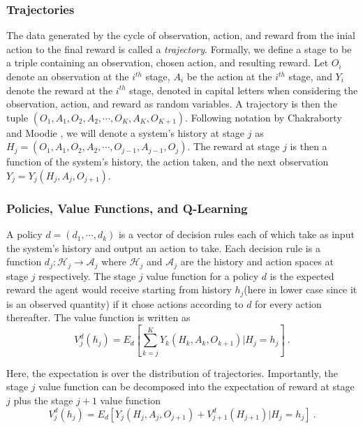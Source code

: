 \subsubsection{Trajectories}

The data generated by the cycle of observation, action, and reward from the inial action to the final reward is called a \textit{trajectory}. Formally, we define a stage to be a triple containing an observation, chosen action, and resulting reward. Let $O_i$ denote an observation at the $i^{th}$ stage, $ A_i $ be the action at the $ i^{th} $ stage, and $ Y_i $ denote the reward at the $ i^{th}$ stage, denoted in capital letters when considering the observation, action, and reward as random variables.  A  trajectory is then the tuple $ (O_1, A_1, O_2, A_2,  \cdots, O_K, A_K, O_{K+1})$.  Following notation by Chakraborty and Moodie \cite{chakraborty2013statistical}, we will denote a system’s history at stage $ j $ as $ H_j = (O_1, A_1, O_2, A_2, \cdots , O_{j-1}, A_{j-1}, O_j) $.  The reward at stage $j$ is then a function of the system’s history, the action taken, and the next observation $ Y_j = Y_j(H_j, A_j, O_{j+1}) $.

\subsubsection{Policies, Value Functions, and Q-Learning}

A policy $ d = (d_1, \cdots, d_k) $ is a vector of decision rules each of which take as input the system’s history and output an action to take.  Each decision rule is a function $d_j : \mathcal{H}_j \to \mathcal{A}_j$ where $\mathcal{H}_j$ and $\mathcal{A}_j$ are the history and action spaces at stage $j$ respectively.  The stage $ j $ value function for a policy $ d $ is the expected reward the agent would receive starting from history $ h_j  $(here in lower case since it is an observed quantity) if it chose actions according to $ d $ for every action thereafter.  The value function is written as
\begin{equation}
	V^d_j(h_j) = E_d\left[ \sum_{k=j}^K Y_k(H_k, A_k, O_{k+1}) \Bigg\lvert H_j = h_j\right] \>.
\end{equation}

\noindent Here, the expectation is over the distribution of trajectories. Importantly, the stage $ j $ 
value function can be decomposed into the expectation of reward at stage $ j $ plus the stage $ j+1  $ value function  \cite{chakraborty2013statistical}
\begin{equation}
V^d_j(h_j) = E_d\left[Y_j(H_j, A_j, O_{j+1}) + V^d_{j+1}(H_{j+1}) \vert H_j = h_j\right] \>.
\end{equation}


